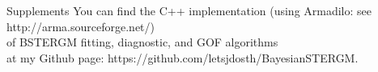 \documentclass[aspectratio=169,ignorenonframetext,9pt]{beamer}
\theoremstyle{plain}
\theoremstyle{definition}
\begin{document}
\begin{frame}{Supplements}
    You can find the C++ implementation (using Armadilo: see http://arma.sourceforge.net/)
    \\ of BSTERGM fitting, diagnostic, and GOF algorithms
    \\ at my Github page: https://github.com/letsjdosth/BayesianSTERGM.
\end{frame}



\nocite{*}


\end{document}
